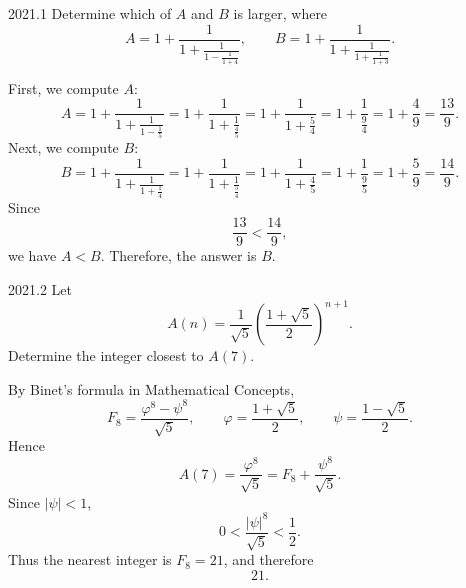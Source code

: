     \begin{pastproblem}{2021.1}
        Determine which of $A$ and $B$ is larger, where
        \[
            A
            =
            1+\frac{1}{1+\frac{1}{1-\frac{1}{1+4}}},
            \qquad
            B
            =
            1+\frac{1}{1+\frac{1}{1+\frac{1}{1+3}}}.
        \]
    \end{pastproblem}

    \begin{solution}
        First, we compute $A$:
        \[
            A
            =
            1+\frac{1}{1+\frac{1}{1-\frac{1}{5}}}
            =
            1+\frac{1}{1+\frac{1}{\frac{4}{5}}}
            =
            1+\frac{1}{1+\frac{5}{4}}
            =
            1+\frac{1}{\frac{9}{4}}
            =
            1+\frac{4}{9}
            =
            \frac{13}{9}.
        \]
        Next, we compute $B$:
        \[
            B
            =
            1+\frac{1}{1+\frac{1}{1+\frac{1}{4}}}
            =
            1+\frac{1}{1+\frac{1}{\frac{5}{4}}}
            =
            1+\frac{1}{1+\frac{4}{5}}
            =
            1+\frac{1}{\frac{9}{5}}
            =
            1+\frac{5}{9}
            =
            \frac{14}{9}.
        \]
        Since
        \[
            \frac{13}{9}<\frac{14}{9},
        \]
        we have $A<B$. Therefore, the answer is $\boxed{B}$.
    \end{solution}

    \begin{pastproblem}{2021.2}
        Let
        \[
            A(n)
            =
            \frac{1}{\sqrt5}
            \left(\frac{1+\sqrt5}{2}\right)^{n+1}.
        \]
        Determine the integer closest to $A(7)$.
    \end{pastproblem}

    \begin{solution}
        By Binet's formula in Mathematical Concepts,
        \[
            F_8
            =
            \frac{\varphi^8-\psi^8}{\sqrt5},
            \qquad
            \varphi=\frac{1+\sqrt5}{2},
            \qquad
            \psi=\frac{1-\sqrt5}{2}.
        \]
        Hence
        \[
            A(7)=\frac{\varphi^8}{\sqrt5}
            =F_8+\frac{\psi^8}{\sqrt5}.
        \]
        Since $|\psi|<1$,
        \[
            0<\frac{|\psi|^8}{\sqrt5}<\frac12.
        \]
        Thus the nearest integer is $F_8=21$, and therefore
        \[
            \boxed{21}.
        \]
    \end{solution}

